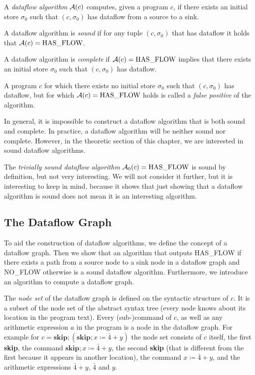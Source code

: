 A \emph{dataflow algorithm} $\operatorname{\mathcal{A}}(c)$ computes, given a program $c$,
if there exists an initial store $\sigma_0$ 
such that $(c, \sigma_0)$ has dataflow from a source to a sink.

A dataflow algorithm is \emph{sound} if for any tuple $(c, \sigma_0)$ that
has dataflow it holds that $\operatorname{\mathcal{A}}(c) = \text{HAS\_FLOW}$.

A dataflow algorithm is \emph{complete} if $\operatorname{\mathcal{A}}(c) = \text{HAS\_FLOW}$
implies that there exists an initial store $\sigma_0$
 such that $(c, \sigma_0)$ has dataflow.

A program $c$ for which there exists no initial store $\sigma_0$ such that 
$(c, \sigma_0)$ has dataflow, but for which $\operatorname{\mathcal{A}}(c) = \text{HAS\_FLOW}$ holds
is called a \emph{false positive} of the algorithm.

In general, it is impossible to construct a dataflow algorithm that is both 
sound and complete.
In practice, a dataflow algorithm will be neither sound nor complete.
However, in the theoretic section of this chapter, we are interested in 
sound dataflow algorithms.

The \emph{trivially sound dataflow algorithm} $\operatorname{\mathcal{A}}_0(c) = \text{HAS\_FLOW}$ 
is sound by definition, but not very interesting.
We will not consider it further, but it is interesting to keep in mind,
because it shows that just showing that a dataflow algorithm is sound does not
mean it is an interesting algorithm.

\subsection{The Dataflow Graph}
To aid the construction of dataflow algorithms, we define the concept
of a dataflow graph.
Then we show that an algorithm that outputs HAS\_FLOW if 
there exists a path from a source 
node to a sink node in a dataflow graph and NO\_FLOW otherwise
is a sound dataflow algorithm.
Furthermore, we introduce an algorithm to compute a dataflow graph.

The \emph{node set} of the dataflow graph is defined on the syntactic structure
of $c$. It is a subset of the node set of the abstract syntax tree
(every node knows about its location in the program text).
Every (sub-)command of $c$, as well as any arithmetic expression $a$ in the 
program is a node in the dataflow graph.
For example for
$c = \textbf{skip}; (\textbf{skip}; x \coloneqq \bar{4} + y)$
the node set consists of $c$ itself, the first \textbf{skip}, the command 
$\textbf{skip}; x \coloneqq \bar{4} + y$, the second \textbf{skip} (that is different 
from the first because it appears in another location), the command
$x \coloneqq \bar{4} + y$, and the arithmetic expressions $\bar{4}+y$,
$\bar{4}$ and $y$.

